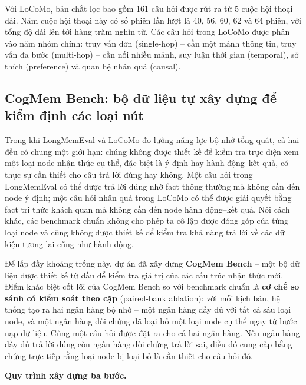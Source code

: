 \documentclass[../main.tex]{subfiles}
\begin{document}
Với LoCoMo, bản chắt lọc bao gồm 161 câu hỏi được rút ra từ 5 cuộc hội thoại dài. Năm cuộc hội thoại này có số phiên lần lượt là 40, 56, 60, 62 và 64 phiên, với tổng độ dài lên tới hàng trăm nghìn từ. Các câu hỏi trong LoCoMo được phân vào năm nhóm chính: truy vấn đơn (single-hop) -- cần một mảnh thông tin, truy vấn đa bước (multi-hop) -- cần nối nhiều mảnh, suy luận thời gian (temporal), sở thích (preference) và quan hệ nhân quả (causal). 

\subsection{CogMem Bench: bộ dữ liệu tự xây dựng để kiểm định các loại nút}

Trong khi LongMemEval và LoCoMo đo lường năng lực bộ nhớ tổng quát, cả hai đều có chung một giới hạn: chúng không được thiết kế để kiểm tra trực diện xem một loại node nhận thức cụ thể, đặc biệt là ý định hay hành động--kết quả, có thực sự cần thiết cho câu trả lời đúng hay không. Một câu hỏi trong LongMemEval có thể được trả lời đúng nhờ fact thông thường mà không cần đến node ý định; một câu hỏi nhân quả trong LoCoMo có thể được giải quyết bằng fact tri thức khách quan mà không cần đến node hành động--kết quả. Nói cách khác, các benchmark chuẩn không cho phép ta cô lập được đóng góp của từng loại node và cũng không được thiết kế để kiểm tra khả năng trả lời về các dữ kiện tương lai cũng như hành động.

Để lấp đầy khoảng trống này, dự án đã xây dựng \textbf{CogMem Bench} -- một bộ dữ liệu được thiết kế từ đầu để kiểm tra giá trị của các cấu trúc nhận thức mới. Điểm khác biệt cốt lõi của CogMem Bench so với benchmark chuẩn là \textbf{cơ chế so sánh có kiểm soát theo cặp} (paired-bank ablation): với mỗi kịch bản, hệ thống tạo ra hai ngân hàng bộ nhớ -- một ngân hàng đầy đủ với tất cả sáu loại node, và một ngân hàng đối chứng đã loại bỏ một loại node cụ thể ngay từ bước nạp dữ liệu. Cùng một câu hỏi được đặt ra cho cả hai ngân hàng. Nếu ngân hàng đầy đủ trả lời đúng còn ngân hàng đối chứng trả lời sai, điều đó cung cấp bằng chứng trực tiếp rằng loại node bị loại bỏ là cần thiết cho câu hỏi đó.

\textbf{Quy trình xây dựng ba bước.} 
\end{document}
